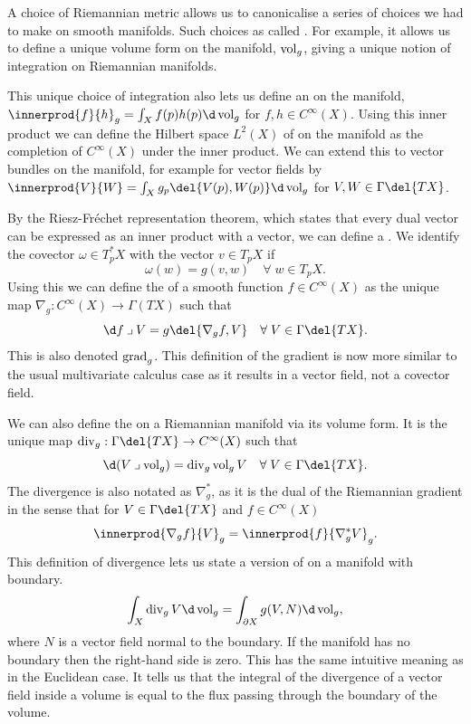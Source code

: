 A choice of Riemannian metric allows us to canonicalise a series of choices we had to make on smooth manifolds.
Such choices as called .
For example, it allows us to define a unique volume form on the manifold, \(\operatorname{vol}_g\), giving a unique notion of integration on Riemannian manifolds.

This unique choice of integration also lets us define an  on the manifold, \(\innerprod{f}{h}_g = \int_X f(p)h(p) \d\vol_g\) for \(f,h\in C^\infty(X)\).
Using this inner product we can define the Hilbert space \(L^2(X)\) of  on the manifold as the completion of \(C^\infty(X)\) under the inner product.
We can extend this to vector bundles on the manifold, for example for vector fields by \(\innerprod{V}{W} = \int_X g_p\del{V(p), W(p)} \d \vol_g\) for \(V, W \in \Gamma\del{TX}\).

By the Riesz-Fr\'echet representation theorem, which states that every dual vector can be expressed as an inner product with a vector, we can define a .
We identify the covector \(\omega \in T_p^*X\) with the vector \(v\in T_pX\) if 
\[\omega(w) = g(v , w) \quad \forall \; w\in T_pX.\]
Using this we can define the  of a smooth function \(f\in C^\infty (X)\) as the unique map \(\nabla_g: C^\infty(X) \to \Gamma(TX)\) such that 
\[\d f \iprod V = g\del{\nabla_g f, V} \quad\forall\; V\in \Gamma\del{TX}.\]
This is also denoted \(\operatorname{grad}_g\).
This definition of the gradient is now more similar to the usual multivariate calculus case as it results in a vector field, not a covector field.

We can also define the  on a Riemannian manifold via its volume form.
It is the unique map \(\dive_g: \Gamma\del{TX} \to C^\infty(X)\) such that
\[\d(V \iprod \vol_g) = \dive_g \vol_g V \quad \forall \; V \in \Gamma\del{TX}.\]
The divergence is also notated as \(\nabla^*_g\), as it is the dual of the Riemannian gradient in the sense that for \(V\in \Gamma\del{TX}\) and \(f\in C^\infty(X)\) \[\innerprod{\nabla_g f}{V}_g = \innerprod{f}{\nabla^*_g V}_g.\]
This definition of divergence lets us state a version of  on a manifold with boundary.
\[\int_X \dive_g V \d\vol_g = \int_{\partial X} g(V, N) \d\vol_g,\]
where \(N\) is a vector field normal to the boundary.
If the manifold has no boundary then the right-hand side is zero.
This has the same intuitive meaning as in the Euclidean case.
It tells us that the integral of the divergence of a vector field inside a volume is equal to the flux passing through the boundary of the volume.

